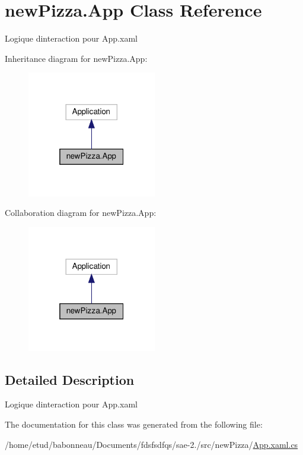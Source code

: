 \hypertarget{classnewPizza_1_1App}{}\section{new\+Pizza.\+App Class Reference}
\label{classnewPizza_1_1App}


Logique d\textquotesingle{}interaction pour App.\+xaml  




Inheritance diagram for new\+Pizza.\+App\+:
\nopagebreak
\begin{figure}[H]
\begin{center}
\leavevmode
\includegraphics[width=160pt]{classnewPizza_1_1App__inherit__graph}
\end{center}
\end{figure}


Collaboration diagram for new\+Pizza.\+App\+:
\nopagebreak
\begin{figure}[H]
\begin{center}
\leavevmode
\includegraphics[width=160pt]{classnewPizza_1_1App__coll__graph}
\end{center}
\end{figure}


\subsection{Detailed Description}
Logique d\textquotesingle{}interaction pour App.\+xaml 



The documentation for this class was generated from the following file\+:\begin{DoxyCompactItemize}
\item 
/home/etud/babonneau/\+Documents/fdsfsdfqs/sae-\/2./src/new\+Pizza/\hyperlink{App_8xaml_8cs}{App.\+xaml.\+cs}\end{DoxyCompactItemize}
